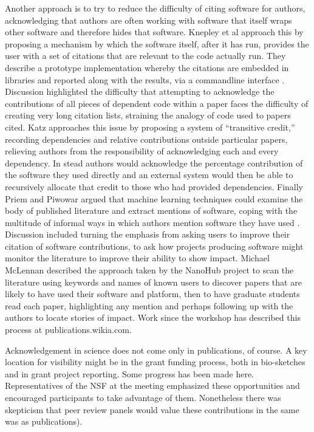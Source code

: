 \documentclass[11pt, oneside]{amsart}
\begin{document}
Another approach is to try to reduce the difficulty of citing software for authors, acknowledging that authors are often working with software that itself wraps other software and therefore hides that software. Knepley et al approach this by proposing a mechanism by which the software itself, after it has run, provides the user with a set of citations that are relevant to the code actually run. They describe a prototype implementation whereby the citations are embedded in libraries and reported along with the results, via a commandline interface \cite{Knepley_WSSSPE}. Discussion highlighted the difficulty that attempting to acknowledge the contributions of all pieces of dependent code within a paper faces the difficulty of creating very long citation lists, straining the analogy of code used to papers cited. Katz approaches this issue by proposing a system of ``transitive credit,'' recording dependencies and relative contributions outside particular papers, relieving authors from the responsibility of acknowledging each and every dependency. In stead authors would acknowledge the percentage contribution of the software they used directly and an external system would then be able to recursively allocate that credit to those who had provided dependencies. Finally Priem and Piwowar argued that machine learning techniques could examine the body of published literature and extract mentions of software, coping with the multitude of informal ways in which authors mention software they have used \cite{Priem_WSSSPE}.  Discussion included turning the emphasis from asking users to improve their citation of software contributions, to ask how projects producing software might monitor the literature to improve their ability to show impact. Michael McLennan described the approach taken by the NanoHub project to scan the literature using keywords and names of known users to discover papers that are likely to have used their software and platform, then to have graduate students read each paper, highlighting any mention and perhaps following up with the authors to locate stories of impact.  Work since the workshop has described this process at publications.wikia.com.

Acknowledgement in science does not come only in publications, of course. A key location for visibility might be in the grant funding process, both in bio-sketches and in grant project reporting. Some progress has been made here. Representatives of the NSF at the meeting emphasized these opportunities and encouraged participants to take advantage of them. Nonetheless there was skepticism that peer review panels would value these contributions in the same was as publications). 
\end{document}
